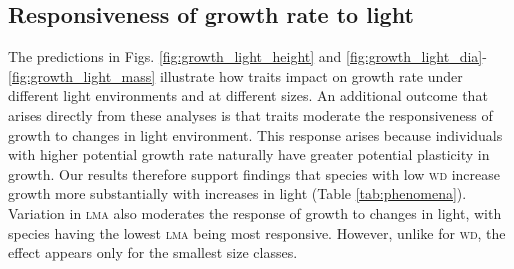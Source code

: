 \documentclass[9pt,twocolumn,twoside,lineno]{pnas-new}
\newcommand{\lma}{\textsc{lma}}
\newcommand{\wood}{\textsc{wd}}
\begin{document}
\subsection{Responsiveness of growth rate to light}

The predictions in Figs. \ref{fig:growth_light_height} and \ref{fig:growth_light_dia}-\ref{fig:growth_light_mass} illustrate how traits impact on growth rate under different light environments and at different sizes. An additional outcome that arises directly from these analyses is that traits moderate the responsiveness of growth to changes in light environment. This response arises because individuals with higher potential growth rate naturally have greater potential plasticity in growth. Our results therefore support findings that species with low {\wood} increase growth more substantially with increases in light (Table \ref{tab:phenomena}). Variation in {\lma} also moderates the response of growth to changes in light, with species having the lowest {\lma} being most responsive. However, unlike for {\wood}, the effect appears only for the smallest size classes.
\end{document}
